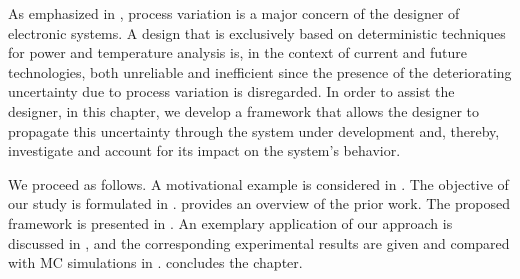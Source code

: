 As emphasized in , process variation is a major
concern of the designer of electronic systems. A design that is exclusively
based on deterministic techniques for power and temperature analysis is, in the
context of current and future technologies, both unreliable and inefficient
since the presence of the deteriorating uncertainty due to process variation is
disregarded. In order to assist the designer, in this chapter, we develop a
framework that allows the designer to propagate this uncertainty through the
system under development and, thereby, investigate and account for its impact on
the system's behavior.

We proceed as follows. A motivational example is considered in
. The objective of our study is formulated in
.  provides an overview of the prior work.
The proposed framework is presented in . An exemplary
application of our approach is discussed in , and the
corresponding experimental results are given and compared with \ac{MC}
simulations in .  concludes the
chapter.
